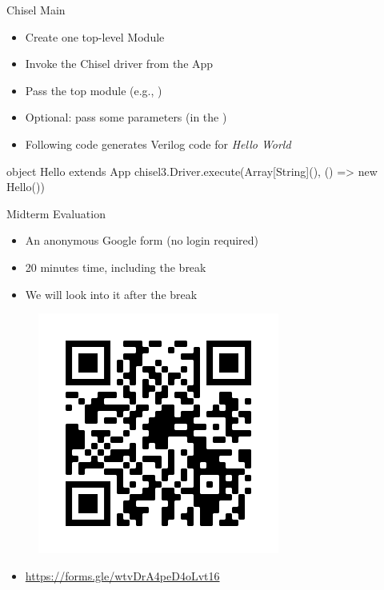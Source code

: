 \begin{frame}[fragile]{Chisel Main}

\begin{itemize}
\item Create one top-level Module
\item Invoke the Chisel driver from the App
\item Pass the top module (e.g., )
\item Optional: pass some parameters (in the )
\item Following code generates Verilog code for \emph{Hello World}
\end{itemize}
\begin{chisel}
object Hello extends App {
  chisel3.Driver.execute(Array[String](), () => new Hello())
}
\end{chisel}
\end{frame}




\begin{frame}[fragile]{Midterm Evaluation}
\begin{itemize}
\item An anonymous Google form (no login required)
\item 20 minutes time, including the break
\item We will look into it after the break
\end{itemize}
\begin{figure}
  \includegraphics[scale=0.5]{forms2020}
\end{figure}
\begin{itemize}
\item \url{https://forms.gle/wtvDrA4peD4oLvt16}
\end{itemize}
\end{frame}

